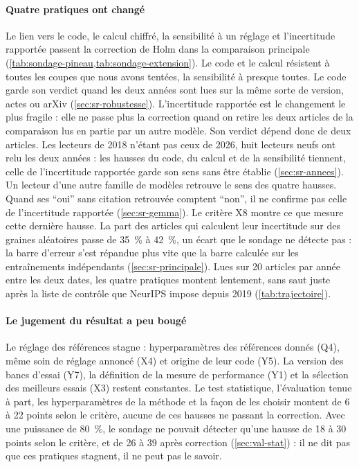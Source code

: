 \paragraph{Quatre pratiques ont changé} Le lien vers le code, le calcul chiffré, la sensibilité à un
réglage et l'incertitude rapportée passent la correction de Holm dans la comparaison principale
(\cref{tab:sondage-pineau,tab:sondage-extension}). Le code et le calcul résistent à toutes les coupes
que nous avons tentées, la sensibilité à presque toutes. Le code garde son verdict quand les deux
années sont lues sur la même sorte de version, actes ou arXiv (\cref{sec:sr-robustesse}).
L'incertitude rapportée est le changement le plus fragile : elle ne passe plus la correction quand
on retire les deux articles de la comparaison lus en partie par un autre modèle. Son verdict dépend
donc de deux articles. Les lecteurs de 2018 n'étant pas ceux de 2026, huit lecteurs neufs ont relu
les deux années : les hausses du code, du calcul et de la sensibilité tiennent, celle de
l'incertitude rapportée garde son sens sans être établie (\cref{sec:sr-annees}). Un lecteur d'une
autre famille de modèles retrouve le sens des quatre hausses. Quand ses \enquote{oui} sans citation
retrouvée comptent \enquote{non}, il ne confirme pas celle de l'incertitude rapportée
(\cref{sec:sr-gemma}). Le critère X8 montre ce que mesure cette dernière hausse.
La part des articles qui calculent leur incertitude sur des graines aléatoires passe de 35~\% à
42~\%, un écart que le sondage ne détecte pas : la barre d'erreur s'est répandue plus vite que la
barre calculée sur les entraînements indépendants (\cref{sec:sr-principale}). Lues sur 20 articles
par année entre les deux dates, les quatre pratiques montent lentement, sans saut juste après la
liste de contrôle que NeurIPS impose depuis 2019 (\cref{tab:trajectoire}).

\paragraph{Le jugement du résultat a peu bougé} Le réglage des références stagne : hyperparamètres des références donnés (Q4), même soin de réglage
annoncé (X4) et origine de leur code (Y5). La version des bancs d'essai (Y7), la définition de la
mesure de performance (Y1) et la sélection des meilleurs essais (X3) restent constantes. Le test
statistique, l'évaluation tenue à part, les hyperparamètres de la méthode et la façon de les choisir
montent de 6 à 22 points selon le critère, aucune de ces hausses ne passant la correction. Avec une
puissance de 80~\%, le sondage ne pouvait détecter qu'une hausse de 18 à 30 points selon le critère,
et de 26 à 39 après correction (\cref{sec:val-stat}) : il ne dit pas que ces pratiques stagnent, il
ne peut pas le savoir.

